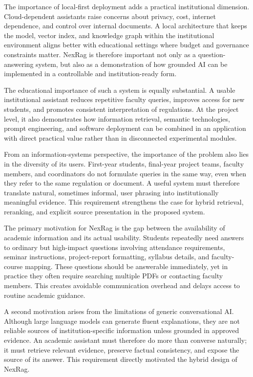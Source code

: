 The importance of local-first deployment adds a practical institutional dimension. Cloud-dependent assistants raise concerns about privacy, cost, internet dependence, and control over internal documents. A local architecture that keeps the model, vector index, and knowledge graph within the institutional environment aligns better with educational settings where budget and governance constraints matter. NexRag is therefore important not only as a question-answering system, but also as a demonstration of how grounded AI can be implemented in a controllable and institution-ready form.

The educational importance of such a system is equally substantial. A usable institutional assistant reduces repetitive faculty queries, improves access for new students, and promotes consistent interpretation of regulations. At the project level, it also demonstrates how information retrieval, semantic technologies, prompt engineering, and software deployment can be combined in an application with direct practical value rather than in disconnected experimental modules.

From an information-systems perspective, the importance of the problem also lies in the diversity of its users. First-year students, final-year project teams, faculty members, and coordinators do not formulate queries in the same way, even when they refer to the same regulation or document. A useful system must therefore translate natural, sometimes informal, user phrasing into institutionally meaningful evidence. This requirement strengthens the case for hybrid retrieval, reranking, and explicit source presentation in the proposed system.

\label{sec:introduction-motivation}

The primary motivation for NexRag is the gap between the availability of academic information and its actual usability. Students repeatedly need answers to ordinary but high-impact questions involving attendance requirements, seminar instructions, project-report formatting, syllabus details, and faculty-course mapping. These questions should be answerable immediately, yet in practice they often require searching multiple PDFs or contacting faculty members. This creates avoidable communication overhead and delays access to routine academic guidance.

A second motivation arises from the limitations of generic conversational AI. Although large language models can generate fluent explanations, they are not reliable sources of institution-specific information unless grounded in approved evidence. An academic assistant must therefore do more than converse naturally; it must retrieve relevant evidence, preserve factual consistency, and expose the source of its answer. This requirement directly motivated the hybrid design of NexRag.

